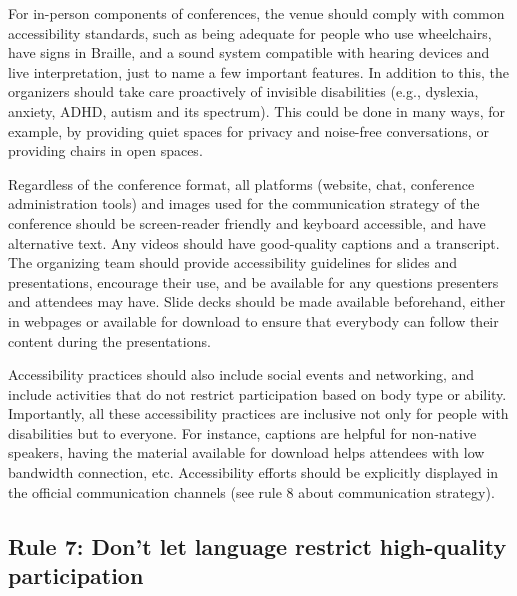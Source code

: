 \documentclass[10pt,letterpaper]{article}
\begin{document}
For in-person components of conferences, the venue should comply with common accessibility standards, such as being adequate for people who use wheelchairs, have signs in Braille, and a sound system compatible with hearing devices and live interpretation, just to name a few important features. In addition to this, the organizers should take care proactively of invisible disabilities (e.g., dyslexia, anxiety, ADHD, autism and its spectrum). This could be done in many ways, for example, by providing quiet spaces for privacy and noise-free conversations, or providing chairs in open spaces.

Regardless of the conference format, all platforms (website, chat, conference administration tools) and images used for the communication strategy of the conference should be screen-reader friendly and keyboard accessible, and have alternative text. Any videos should have good-quality captions and a transcript.
The organizing team should provide accessibility guidelines for slides and presentations, encourage their use, and be available for any questions presenters and attendees may have. Slide decks should be made available beforehand, either in webpages or available for download to ensure that everybody can follow their content during the presentations. 

Accessibility practices should also include social events and networking, and include activities that do not restrict participation based on body type or ability. Importantly, all these accessibility practices are inclusive not only for people with disabilities but to everyone.
For instance, captions are helpful for non-native speakers, having the material available for download helps attendees with low bandwidth connection, etc. Accessibility efforts should be explicitly displayed in the official communication channels (see rule 8 about communication strategy). 



\subsection*{Rule 7: Don't let language restrict high-quality participation}
\label{rule_language}
\end{document}
